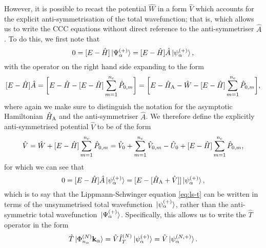 \documentclass[]{article}
\begin{document}
However, it is possible to recast the potential $\hat{W}$ in a form $\hat{V}$
which accounts for the explicit anti-symmetrisation of the total wavefunction;
that is, which allows us to write the CCC equations without direct reference to
the anti-symmetriser $\hat{A}$.
To do this, we first note that
\begin{equation*}
  0
  =
  \lrsq
  {
    E
    -
    \hat{H}
  }
  \ket*{\Psi_{\alpha}^{\lr{+}}}
  =
  \lrsq
  {
    E
    -
    \hat{H}
  }
  \hat{A}
  \ket*{\psi_{\alpha}^{\lr{+}}}
  ,
\end{equation*}
with the operator on the right hand side expanding to the form
\begin{equation*}
  \lrsq
  {
    E
    -
    \hat{H}
  }
  \hat{A}
  =
  \lrsq[\bigg]
  {
    E
    -
    \hat{H}
    -
    \lrsq
    {
      E
      -
      \hat{H}
    }
    \sum_{m = 1}^{n_{\mathrm{e}}}
    \hat{P}_{0, m}
  }
  =
  \lrsq[\bigg]
  {
    E
    -
    \hat{H}_{\rm{A}}
    -
    \hat{W}
    -
    \lrsq
    {
      E
      -
      \hat{H}
    }
    \sum_{m = 1}^{n_{\mathrm{e}}}
    \hat{P}_{0, m}
  }
  ,
\end{equation*}
where again we make sure to distinguish the notation for the asymptotic
Hamiltonian $\hat{H}_{\rm{A}}$ and the anti-symmetriser $\hat{A}$.
We therefore define the explicitly anti-symmetrised potential $\hat{V}$ to be of
the form
\begin{equation}
  \label{eq:ccc-v}
  \hat{V}
  =
  \hat{W}
  +
  \lrsq
  {
    E
    -
    \hat{H}
  }
  \sum_{m = 1}^{n_{\mathrm{e}}}
  \hat{P}_{0, m}
  =
  \hat{V}_{0}
  +
  \sum_{m = 1}^{n_{\mathrm{e}}}
  \hat{V}_{0, m}
  -
  \hat{U}_{0}
  +
  \lrsq
  {
    E
    -
    \hat{H}
  }
  \sum_{m = 1}^{n_{\mathrm{e}}}
  \hat{P}_{0, m}
  ,
\end{equation}
for which we can see that
\begin{equation*}
  \label{eq:ccc-v-2}
  0
  =
  \lrsq
  {
    E
    -
    \hat{H}
  }
  \hat{A}
  \ket*{\psi_{\alpha}^{\lr{+}}}
  =
  \lrsq
  {
    E
    -
    \lrsq
    {
      \hat{H}_{\rm{A}}
      +
      \hat{V}
    }
  }
  \ket*{\psi_{\alpha}^{\lr{+}}}
  ,
\end{equation*}
which is to say that the Lippmann-Schwinger equation \eqref{eq:ls-t} can be
written in terms of the unsymmetrised total wavefunction
$\ket*{\psi_{\alpha}^{\lr{+}}}$, rather than the anti-symmetric total
wavefunction $\ket*{\Psi_{\alpha}^{\lr{+}}}$.
Specifically, this allows us to write the $\hat{T}$ operator in the form
\begin{equation}
  \label{eq:ccc-t-v}
  \hat{T}
  \ket*{\Phi_{n_{\alpha}}^{\lr{N}} \vb{k}_{\alpha}}
  =
  \hat{V}
  \hat{I}_{T}^{\lr{N}}
  \ket*{\psi_{\alpha}^{\lr{+}}}
  =
  \hat{V}
  \ket*{\psi_{\alpha}^{\lr{N, +}}}
  .
\end{equation}
\end{document}
